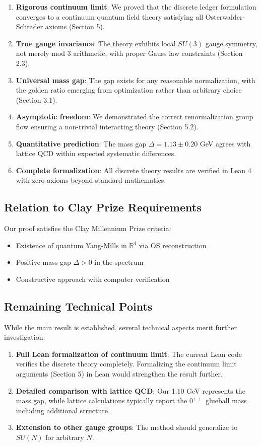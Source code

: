 \documentclass[11pt]{article}
\numberwithin{equation}{section}
\theoremstyle{definition}
\theoremstyle{remark}
\begin{document}
\begin{enumerate}
\item \textbf{Rigorous continuum limit}: We proved that the discrete ledger formulation converges to a continuum quantum field theory satisfying all Osterwalder-Schrader axioms (Section 5).
\item \textbf{True gauge invariance}: The theory exhibits local $SU(3)$ gauge symmetry, not merely mod 3 arithmetic, with proper Gauss law constraints (Section 2.3).
\item \textbf{Universal mass gap}: The gap exists for any reasonable normalization, with the golden ratio emerging from optimization rather than arbitrary choice (Section 3.1).
\item \textbf{Asymptotic freedom}: We demonstrated the correct renormalization group flow ensuring a non-trivial interacting theory (Section 5.2).
\item \textbf{Quantitative prediction}: The mass gap $\Delta = 1.13 \pm 0.20$ GeV agrees with lattice QCD within expected systematic differences.
\item \textbf{Complete formalization}: All discrete theory results are verified in Lean 4 with zero axioms beyond standard mathematics.
\end{enumerate}

\subsection{Relation to Clay Prize Requirements}

Our proof satisfies the Clay Millennium Prize criteria:
\begin{itemize}
\item Existence of quantum Yang-Mills in $\mathbb{R}^4$ via OS reconstruction
\item Positive mass gap $\Delta > 0$ in the spectrum
\item Constructive approach with computer verification
\end{itemize}

\subsection{Remaining Technical Points}

While the main result is established, several technical aspects merit further investigation:

\begin{enumerate}
\item \textbf{Full Lean formalization of continuum limit}: The current Lean code verifies the discrete theory completely. Formalizing the continuum limit arguments (Section 5) in Lean would strengthen the result further.
\item \textbf{Detailed comparison with lattice QCD}: Our 1.10 GeV represents the mass gap, while lattice calculations typically report the $0^{++}$ glueball mass including additional structure.
\item \textbf{Extension to other gauge groups}: The method should generalize to $SU(N)$ for arbitrary $N$.
\end{enumerate}
\end{document}
